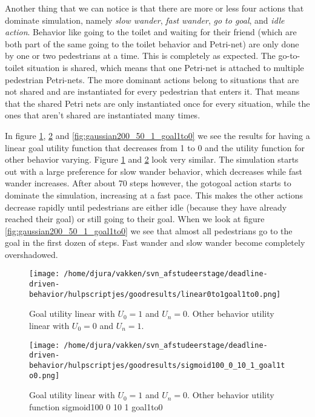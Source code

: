 \documentclass[11pt]{book}
\begin{document}
Another thing that we can notice is that there are more or less four actions that dominate simulation, namely \emph{slow wander}, \emph{fast wander}, \emph{go to goal}, and \emph{idle action}.
 Behavior like going to the toilet and waiting for their friend (which are both part of the same going to the toilet behavior and Petri-net) are only done by one or two pedestrians at a time. This is completely as expected. The go-to-toilet situation is shared, which means that one Petri-net is attached to multiple pedestrian Petri-nets. The more dominant actions belong to situations that are not shared and are instantiated for every pedestrian that enters it. That means that the shared Petri nets are only instantiated once for every situation, while the ones that aren't shared are instantiated many times.

In figure \ref{fig:linear0to1goal1to0}, \ref{fig:sigmoid100_0_10_1_goal1to0} and \ref{fig:gaussian200_50_1_goal1to0} we see the results for having a linear goal utility function that decreases from 1 to 0 and the utility function for other behavior varying. Figure \ref{fig:linear0to1goal1to0} and \ref{fig:sigmoid100_0_10_1_goal1to0} look very similar. The simulation starts out with a large preference for slow wander behavior, which decreases while fast wander increases. After about 70 steps however, the gotogoal action starts to dominate the simulation, increasing at a fast pace. This makes the other actions decrease rapidly until pedestrians are either idle (because they have already reached their goal) or still going to their goal. When we look at figure \ref{fig:gaussian200_50_1_goal1to0} we see that almost all pedestrians go to the goal in the first dozen of steps. Fast wander and slow wander become completely overshadowed.

 


\begin{figure}[b]
\centering            
\texttt{[image: /home/djura/vakken/svn\_afstudeerstage/deadline-driven-behavior/hulpscriptjes/goodresults/linear0to1goal1to0.png]}
\caption{Goal utility linear with $U_0=1$ and $U_n = 0$. Other behavior utility linear with  $U_0=0$ and $U_n=1$.}
\label{fig:linear0to1goal1to0}
\end{figure}

\begin{figure}[b]
\texttt{[image: /home/djura/vakken/svn\_afstudeerstage/deadline-driven-behavior/hulpscriptjes/goodresults/sigmoid100\_0\_10\_1\_goal1to0.png]}
\caption{Goal utility linear with $U_0=1$ and $U_n = 0$. Other behavior utility function sigmoid100 0 10 1 goal1to0}
\label{fig:sigmoid100_0_10_1_goal1to0}
\end{figure}
\end{document}
